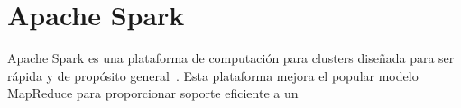 \chapter{Apache Spark \label{spark}}

Apache Spark es una plataforma de computación para clusters diseñada para
ser rápida y de propósito general~\cite{learning-spark}. Esta plataforma
mejora el popular modelo MapReduce para proporcionar soporte eficiente a un

